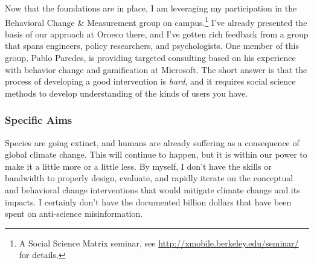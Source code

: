 Now that the foundations are in place, I am leveraging my participation in the
Behavioral Change \& Measurement group on campus.\footnote{A Social Science
    Matrix seminar, see \url{http://xmobile.berkeley.edu/seminar/} for details.}
I've already presented the basis of our approach at Oroeco there, and I've
gotten rich feedback from a group that spans engineers, policy researchers, and
psychologists. One member of this group, Pablo Paredes, is providing targeted
consulting based on his experience with behavior change and gamification at
Microsoft. The short answer is that the process of developing a good
intervention is \emph{hard}, and it requires social science methods to develop
understanding of the kinds of users you have.



\subsubsection{Specific Aims}

Species are going extinct, %
and humans are already suffering as a
consequence of global climate change. %
This will continue to happen, but
it is within our power to make it a little more or a little less. By myself, I
don't have the skills or bandwidth to properly design, evaluate, and rapidly
iterate on the conceptual and behavioral change interventions that would
mitigate climate change and its impacts. I certainly don't have the documented
billion dollars that have been spent on anti-science misinformation.


